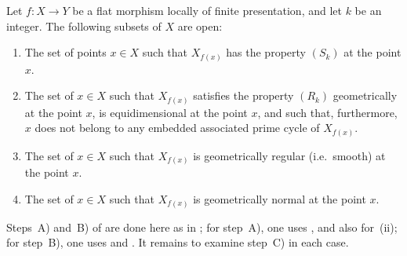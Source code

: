 \begin{theorem}[12.1.6]
\label{IV.12.1.6}
Let $f:X\to Y$ be a \textup{flat} morphism locally of finite presentation, and let $k$ be an integer.
The following subsets of $X$ are open:
\begin{enumerate}[label=\textup{(\roman*)}]
  \item The set of points $x\in X$ such that $X_{f(x)}$ has the property $(S_k)$ at the point $x$.
  \item The set of $x\in X$ such that $X_{f(x)}$ satisfies the property $(R_k)$ geometrically at the point $x$, is equidimensional at the point $x$, and such that, furthermore, $x$ does not belong to any embedded associated prime cycle of $X_{f(x)}$.
  \item The set of $x\in X$ such that $X_{f(x)}$ is geometrically regular \textup{(i.e.}\ smooth\textup{)} at the point $x$.
  \item The set of $x\in X$ such that $X_{f(x)}$ is geometrically normal at the point $x$.
\end{enumerate}

Steps~A) and~B) of  are done here as in ; for step~A), one uses , and also  for~(ii); for step~B), one uses  and .
It remains to examine step~C) in each case.
\end{theorem}

